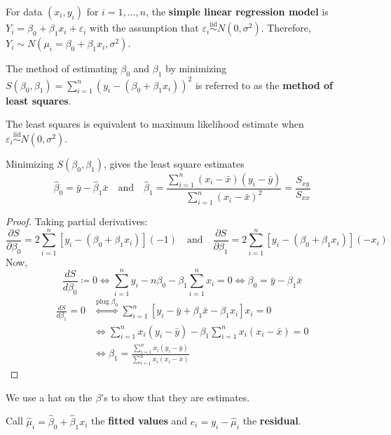 \begin{definition}
    For data $ (x_i,y_i) $ for $ i=1,\ldots,n $, the
    \textbf{simple linear regression model} is
    $ Y_i=\beta_0+\beta_1x_i+\varepsilon_i $
    with the assumption that
    $ \varepsilon_i\stackrel{\text{iid}}{\sim}N(0,\sigma^2) $.
    Therefore,
    $ Y_i\sim N(\mu_i=\beta_0+\beta_1x_i,\sigma^2) $.
\end{definition}
\begin{definition}
    The method of estimating $ \beta_0 $
    and $ \beta_1 $ by minimizing
    $ S(\beta_0,\beta_1)=\sum_{i=1}^{n}(y_i-(\beta_0+\beta_1x_i))^2 $
    is referred to as the \textbf{method of least squares}.
\end{definition}
\begin{remark}
    The least squares is equivalent to maximum likelihood estimate
    when $ \varepsilon_i\stackrel{\text{iid}}{\sim}N(0,\sigma^2) $.
\end{remark}
\begin{theorem}
    Minimizing $ S(\beta_0,\beta_1) $, gives the
    least square estimates
    \[ \hat{\beta}_0=\bar{y}-\hat{\beta}_1\bar{x}\quad\text{and}
        \quad
        \hat{\beta}_1=
        \frac{\sum_{i=1}^{n} (x_i-\bar{x})(y_i-\bar{y})}{
            \sum_{i=1}^{n} (x_i-\bar{x})^2
        }=\frac{S_{xy}}{S_{xx}}   \]
\end{theorem}
\begin{proof}
    Taking partial derivatives:
    \[ \frac{\partial S}{\partial\beta_0}=2
        \sum\limits_{i=1}^{n} \left[ y_i-(\beta_0+\beta_1x_i) \right](-1)
        \quad\text{and}\quad
        \frac{\partial S}{\partial\beta_1}=2
        \sum\limits_{i=1}^{n} \left[ y_i-(\beta_0+\beta_1x_i) \right](-x_i)  \]
    Now,
    \[ \frac{dS}{d\beta_0}\coloneq 0
        \iff \sum\limits_{i=1}^{n}y_i-n\beta_0-
        \beta_1 \sum\limits_{i=1}^{n} x_i=0
        \iff \beta_0=\bar{y}-\beta_1\bar{x} \]
    \begin{align*}
        \frac{dS}{d\beta_1}=0
         & \stackrel{\text{plug }\beta_0}{\iff}
        \sum\limits_{i=1}^{n} \left[ y_i-\bar{y}+\beta_1\bar{x}-\beta_1 x_i \right]x_i=0    \\
         & \iff \sum\limits_{i=1}^{n} x_i(y_i-\bar{y})-\beta_1
        \sum\limits_{i=1}^{n} x_i(x_i-\bar{x})=0                                            \\
         & \iff \beta_1=\frac{\sum\limits_{i=1}^{n} x_i(y_i-\bar{y})}{\sum\limits_{i=1}^{n}
            x_i
            (x_i-\bar{x})}
    \end{align*}
\end{proof}
\begin{remark}
    We use a hat on the $ \beta $'s to show that they are estimates.
\end{remark}
Call $ \hat{\mu}_i=\hat{\beta}_0+\hat{\beta}_1x_i $ the \textbf{fitted values}
and $ e_i=y_i-\hat{\mu}_i $ the \textbf{residual}.
